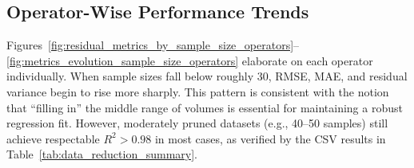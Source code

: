 \subsection{Operator-Wise Performance Trends}
\label{subsec:operator-wise-sample-size-analysis}

Figures~\ref{fig:residual_metrics_by_sample_size_operators}--\ref{fig:metrics_evolution_sample_size_operators} elaborate on each operator individually.
When sample sizes fall below roughly 30, \ac{RMSE}, \ac{MAE}, and residual variance begin to rise more sharply.
This pattern is consistent with the notion that “filling in” the middle range of volumes is essential for maintaining a robust regression fit.
However, moderately pruned datasets (e.g., 40–50 samples) still achieve respectable $R^2 > 0.98$ in most cases, as verified by the CSV results in Table~\ref{tab:data_reduction_summary}. 

